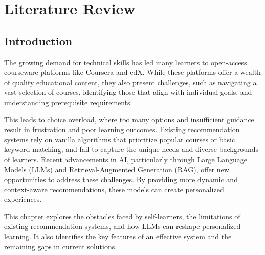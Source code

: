 \chapter{Literature Review} \label{chap:chap-2}




    


\section{Introduction}
The growing demand for technical skills has led many learners to open-access courseware platforms like Coursera and edX. While these platforms offer a wealth of quality educational content, they also present challenges, such as navigating a vast selection of courses, identifying those that align with individual goals, and understanding prerequisite requirements. 

This leads to choice overload, where too many options and insufficient guidance result in frustration and poor learning outcomes. Existing recommendation systems rely on vanilla algorithms that prioritize popular courses or basic keyword matching, and fail to capture the unique needs and diverse backgrounds of learners. Recent advancements in AI, particularly through Large Language Models (LLMs) and Retrieval-Augmented Generation (RAG), offer new opportunities to address these challenges. By providing more dynamic and context-aware recommendations, these models can create personalized experiences. 

This chapter explores the obstacles faced by self-learners, the limitations of existing recommendation systems, and how LLMs can reshape personalized learning. It also identifies the key features of an effective system and the remaining gaps in current solutions.

